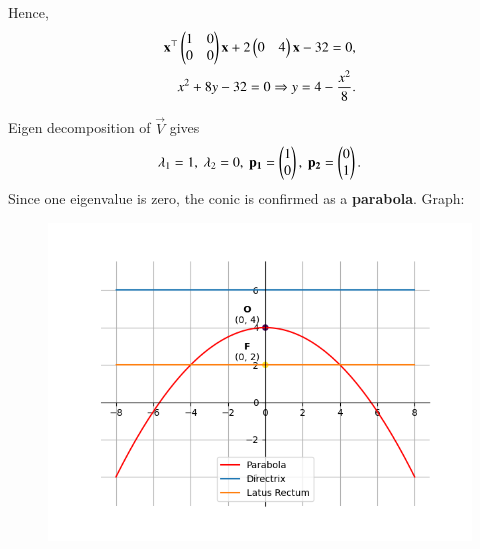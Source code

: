\documentclass[journal,12pt,onecolumn]{IEEEtran}
\begin{document}
Hence,
\begin{align}
\mathbf{x}^\top\begin{pmatrix}1 & 0 \\ 0 & 0\end{pmatrix}\mathbf{x} + 2\begin{pmatrix}0 & 4\end{pmatrix}\mathbf{x} - 32 = 0,\\
x^2 + 8y - 32 = 0 \Rightarrow y =4- \frac{x^2}{8}.
\end{align}

Eigen decomposition of $\vec{V}$ gives
\begin{align}
\lambda_1 = 1, \ \lambda_2 = 0, \ 
\vec{p_1} = \myvec{1 \\ 0}, \ 
\vec{p_2} = \myvec{0 \\ 1}.
\end{align}
Since one eigenvalue is zero, the conic is confirmed as a \textbf{parabola}.\newline
Graph:
\begin{figure}[H]
    \centering
    \includegraphics[scale=0.5]{plot}
    \caption{}
    \label{fig:plot}
\end{figure}
\end{document}
